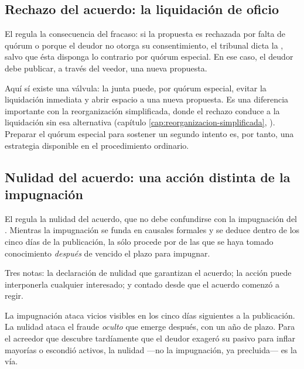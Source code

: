 \subsection{Rechazo del acuerdo: la liquidación de oficio}

El  regula la consecuencia del fracaso: si la propuesta es rechazada por falta de
quórum o porque el deudor no otorga su consentimiento, el tribunal dicta la
, salvo que
ésta disponga lo contrario por quórum especial. En ese caso, el deudor debe publicar, a través
del veedor, una nueva propuesta.

\begin{alerta}
Aquí sí existe una válvula: la junta puede, por quórum especial, evitar la liquidación inmediata
y abrir espacio a una nueva propuesta. Es una diferencia importante con la reorganización
simplificada, donde el rechazo conduce a la liquidación sin esa alternativa (capítulo
\ref{cap:reorganizacion-simplificada}, ). Preparar el quórum especial para sostener
un segundo intento es, por tanto, una estrategia disponible en el procedimiento ordinario.
\end{alerta}

\subsection{Nulidad del acuerdo: una acción distinta de la impugnación}

El  regula la nulidad del acuerdo, que no debe confundirse con la impugnación del
. Mientras la impugnación se funda en causales formales y se deduce dentro de los cinco
días de la publicación, la  sólo procede por  de las que se haya tomado conocimiento \emph{después} de
vencido el plazo para impugnar.

Tres notas: la declaración de nulidad  que
garantizan el acuerdo; la acción puede interponerla cualquier interesado; y  contado desde que el acuerdo comenzó a regir.

\begin{foco}
La impugnación ataca vicios visibles en los cinco días siguientes a la publicación. La nulidad
ataca el fraude \emph{oculto} que emerge después, con un año de plazo. Para el acreedor que
descubre tardíamente que el deudor exageró su pasivo para inflar mayorías o escondió activos, la
nulidad ---no la impugnación, ya precluida--- es la vía.
\end{foco}

